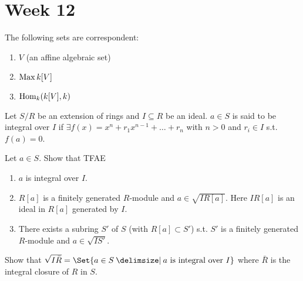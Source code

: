 
\section{Week 12}

\begin{exercise}
  The following sets are correspondent:
  \begin{enumerate}[(1)]
    \item $V$ (an affine algebraic set)
    \item $\operatorname{Max} k[V]$
    \item $\operatorname{Hom}_k(k[V], k)$
  \end{enumerate}
\end{exercise}

\begin{definition}
  Let $S/R$ be an extension of rings and $I \subseteq R$ be an ideal.
  $a \in S$ is said to be integral over $I$ if $\exists f(x) = x^n + r_1x^{n-1}
  + \dots + r_n$ with $n > 0$ and $r_i \in I$ s.t. $f(a) = 0$.
\end{definition}

\begin{exercise}
  Let $a \in S$. Show that TFAE
  \begin{enumerate}[(1)]
    \item $a$ is integral over $I$.
    \item $R[a]$ is a finitely generated $R$-module and $a \in \sqrt{IR[a]}$.
      Here $IR[a]$ is an ideal in $R[a]$ generated by $I$.
    \item There exists a subring $S'$ of $S$ (with $R[a] \subset S'$)
      s.t. $S'$ is a finitely generated $R$-module and $a \in \sqrt{IS'}$.
  \end{enumerate}
\end{exercise}

\begin{exercise}
  Show that $\sqrt{I\bar{R}} = \Set{a \in S \given a \text{~is integral over~} I}$
  where $\bar{R}$ is the integral closure of $R$ in $S$.
\end{exercise}


